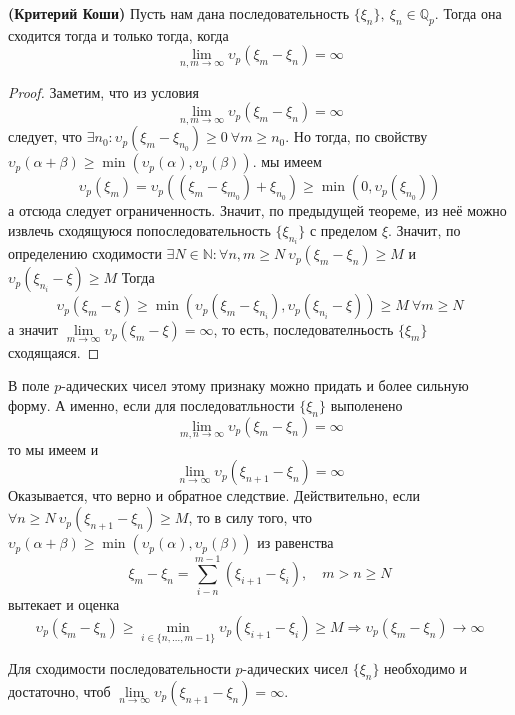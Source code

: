 \documentclass[11pt]{report}
\begin{document}
    \begin{theorem} \textbf{(Критерий Коши)}
        Пусть нам дана последовательность $\{ \xi_n \}, \ \xi_n \in \mathbb{Q}_p$. Тогда она сходится тогда и только тогда, когда
        \[ \lim\limits_{n, m \to \infty} \upsilon_p{(\xi_m - \xi_n)} = \infty \]
    \end{theorem}
    \begin{proof}
        Заметим, что из условия
        \[ \lim\limits_{n, m \to \infty} \upsilon_p{(\xi_m - \xi_n)} = \infty \]
        следует, что $\exists n_0 \colon \upsilon_p{(\xi_m - \xi_{n_0})} \ge 0 \ \forall m \ge n_0$.  Но тогда, по свойству $ \upsilon_p{(\alpha + \beta)} \ge \min(\upsilon_p{(\alpha)}, \upsilon_p{(\beta)})$.
        мы имеем
        \[ \upsilon_p{(\xi_m)} = \upsilon_p{((\xi_m - \xi_{m_0}) + \xi_{n_0})} \ge \min(0, \upsilon_p{(\xi_{n_0})}) \]
        а отсюда следует ограниченность. Значит, по предыдущей теореме, из неё можно извлечь сходящуюся попоследовательность $\{ \xi_{n_i} \}$ с пределом $\xi$.
        Значит, по определению сходимости $\exists N \in \mathbb{N}\colon \forall n, m \ge N \ \upsilon_p{(\xi_m - \xi_n)} \ge M $  и $ \upsilon_p{(\xi_{n_i} - \xi)} \ge M$
        Тогда
        \[ \upsilon_p{(\xi_m - \xi)} \ge \min( \upsilon_p{(\xi_m - \xi_{n_i}), \upsilon_p{(\xi_{n_i} - \xi)}}) \ge M \ \forall m \ge N \]
        а значит $\lim\limits_{m \to \infty} \upsilon_p{(\xi_m - \xi)} = \infty$, то есть, последователньость $\{ \xi_m \}$ сходящаяся.
    \end{proof}

    В поле $p$-адических чисел этому признаку можно придать и более сильную форму. А именно, если для последоватльности $\{ \xi_n \}$
    выполенено
    \[ \lim\limits_{m, n \to \infty} \upsilon_p{(\xi_m - \xi_n)} = \infty\]
    то мы имеем и
    \[ \lim\limits_{n \to \infty} \upsilon_p{(\xi_{n + 1} - \xi_n)} = \infty\]
    Оказывается, что верно и обратное следствие. Действительно, если $\forall n \ge N \ \upsilon_p{(\xi_{n + 1} - \xi_n)} \ge M$, то в силу
    того, что $ \upsilon_p{(\alpha + \beta)} \ge \min(\upsilon_p{(\alpha)}, \upsilon_p{(\beta)})$  из равенства
    \[ \xi_m - \xi_n = \sum_{i - n}^{m - 1} (\xi_{i + 1} - \xi_i), \quad m > n \ge N  \]
    вытекает и оценка
    \[ \upsilon_p{(\xi_m - \xi_n)} \ge \min\limits_{i \in \{ n, \ldots, m - 1 \}} \upsilon_p{(\xi_{i + 1} - \xi_{i})} \ge M \Rightarrow \upsilon_p{(\xi_m - \xi_n)} \to \infty \]
    \begin{theorem}\label{p-adic_convergence}
        Для сходимости последовательности $p$-адических чисел $\{ \xi_n \}$ необходимо и достаточно, чтоб $\lim\limits_{n \to \infty} \upsilon_p{(\xi_{n + 1} - \xi_n)} = \infty$.
    \end{theorem}
\end{document}
